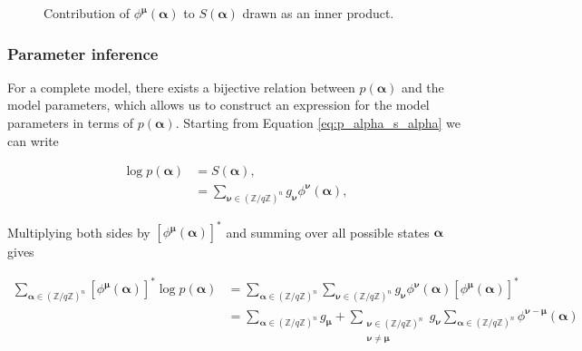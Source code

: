 \begin{figure}[h]
    \caption{Contribution of $\phi^{\boldsymbol{\mu}}(\boldsymbol{\alpha})$ to $S(\boldsymbol{\alpha})$ drawn as an inner product.}
    \label{fig:S_a}
\end{figure}

\subsubsection{Parameter inference}

For a complete model, there exists a bijective relation between $p(\boldsymbol{\alpha})$ and the model parameters, which allows us to construct an expression for the model parameters in terms of $p(\boldsymbol{\alpha})$.
Starting from Equation \ref{eq:p_alpha_s_alpha} we can write

\begin{align*}
    \log p(\boldsymbol{\alpha}) &= S(\boldsymbol{\alpha}),\\
    &= \sum_{\boldsymbol{\nu} \in {(\mathbb{Z}/q\mathbb{Z})}^n} g_{\boldsymbol{\nu}} \phi^{\boldsymbol{\nu}}(\boldsymbol{\alpha}),
\end{align*}

\noindent
Multiplying both sides by $\left[\phi^{\boldsymbol{\mu}}(\boldsymbol{\alpha})\right]^*$ and summing over all possible states $\boldsymbol{\alpha}$ gives 

\begin{align*}
    \sum_{\boldsymbol{\alpha} \in {(\mathbb{Z}/q\mathbb{Z})}^n} \left[\phi^{\boldsymbol{\mu}}(\boldsymbol{\alpha})\right]^* \log p(\boldsymbol{\alpha}) &= \sum_{\boldsymbol{\alpha} \in {(\mathbb{Z}/q\mathbb{Z})}^n} \sum_{\boldsymbol{\nu} \in {(\mathbb{Z}/q\mathbb{Z})}^n} g_{\boldsymbol{\nu}} \phi^{\boldsymbol{\nu}}(\boldsymbol{\alpha}) \left[\phi^{\boldsymbol{\mu}}(\boldsymbol{\alpha})\right]^*\\
    &= \sum_{\boldsymbol{\alpha} \in {(\mathbb{Z}/q\mathbb{Z})}^n} g_{\boldsymbol{\mu}} + \sum_{\substack{\boldsymbol{\nu} \in {(\mathbb{Z}/q\mathbb{Z})}^n \\ \boldsymbol{\nu} \neq \boldsymbol{\mu}}} g_{\boldsymbol{\nu}} \sum_{\boldsymbol{\alpha} \in {(\mathbb{Z}/q\mathbb{Z})}^n} \phi^{\boldsymbol{\nu} - \boldsymbol{\mu}}(\boldsymbol{\alpha})
\end{align*}

